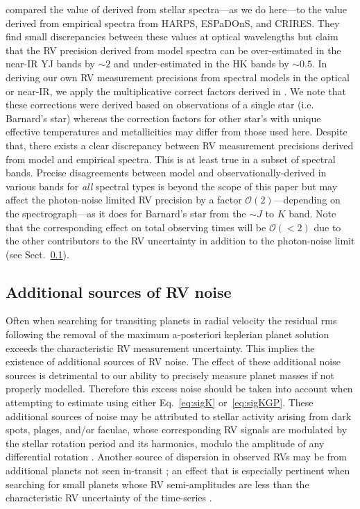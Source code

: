 \cite{artigau18} compared the value of \sigRV{} derived from stellar spectra---as we do
here---to the value derived from empirical spectra from HARPS, ESPaDOnS, and CRIRES. They find
small discrepancies between these values at optical wavelengths but claim that the RV precision
derived from model spectra can be over-estimated in the near-IR YJ bands by $\sim 2$ and 
under-estimated in the HK bands by $\sim 0.5$. In deriving our own RV measurement precisions
from spectral models in the optical or near-IR, we apply the multiplicative correct factors
derived in \cite{artigau18}. We note that these corrections were derived based on observations
of a single star (i.e. Barnard's star) whereas the correction factors for other star's with
unique effective temperatures and metallicities may differ from those used here.
Despite that, there exists a clear discrepancy between RV measurement precisions derived
from model and empirical spectra. This is at least true in a subset of spectral bands.
Precise disagreements between model and observationally-derived \sigRV{} in various
bands for \emph{all} spectral types is beyond the scope of this paper but may affect the
photon-noise limited RV precision by a factor $\mathcal{O}(2)$---depending on the
spectrograph---as it does for Barnard's star from the $\sim J$ to $K$ band. Note that the
corresponding effect on total observing times will be $\mathcal{O}(<2)$ due to 
the other contributors to the RV uncertainty in addition to the photon-noise limit (see
Sect.~\ref{sect:noise}).

\subsection{Additional sources of RV noise} \label{sect:noise}
Often when searching for transiting planets in radial velocity the residual rms following the
removal of the maximum a-posteriori keplerian planet
solution exceeds the characteristic RV measurement uncertainty.
This implies the existence of additional sources of RV noise.
The effect of these additional noise sources is detrimental to our ability to
precisely measure planet masses if not properly modelled. Therefore this excess noise should be taken into
account when attempting to estimate \sigK{} using either Eq.~\ref{eq:sigK} or~\ref{eq:sigKGP}.
These additional sources of noise may be
attributed to stellar activity arising from dark spots, plages, and/or faculae, whose corresponding RV
signals are modulated by the stellar rotation period and its harmonics, modulo the amplitude of any differential
rotation \citep[e.g.][]{forveille09, bonfils13, delfosse13b}.
Another source of dispersion in observed RVs may be
from additional planets not seen in-transit \citep[e.g.][]{christiansen17, cloutier17b, bonfils18};
an effect that is especially pertinent when searching for small planets whose RV semi-amplitudes are
less than the characteristic RV uncertainty of the time-series \citep[e.g.][]{astudillodefru17a}.

